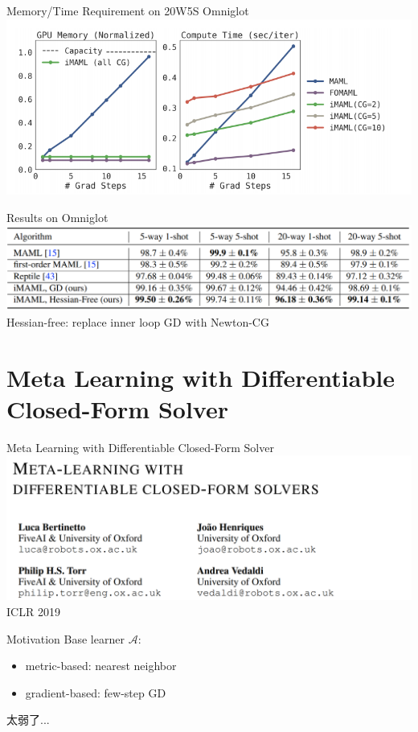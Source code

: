 \documentclass{beamer}
\begin{document}
\begin{frame}[t]{Memory/Time Requirement on 20W5S Omniglot}
  \includegraphics[width=\textwidth]{fig/iMAML-mt.png}
\end{frame}


\begin{frame}{Results on Omniglot}
  \includegraphics[width=\textwidth]{fig/iMAML-result.png}
Hessian-free: replace inner loop GD with Newton-CG
\end{frame}

\section{Meta Learning with Differentiable Closed-Form Solver}
\begin{frame}[t]{Meta Learning with Differentiable Closed-Form Solver}
  \includegraphics[width=\textwidth]{fig/r2d2-title.png}
  \center ICLR 2019
\end{frame}

\begin{frame}[t]{Motivation}
  Base learner $\mathcal{A}$:
  \begin{itemize}
    \item metric-based: nearest neighbor
    \item gradient-based: few-step GD
  \end{itemize}

  \pause
  \vspace{2cm}
  \center \LARGE{太弱了...}
\end{frame}
\end{document}
